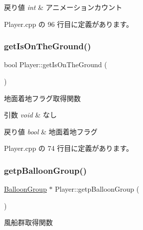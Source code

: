 \begin{DoxyRetVals}{戻り値}
{\em int} & アニメーションカウント \\
\hline
\end{DoxyRetVals}


 Player.\+cpp の 96 行目に定義があります。

\mbox{\label{class_player_aeb7e5d371b48735a6a9088fbe147d531}} 
\subsubsection{\texorpdfstring{get\+Is\+On\+The\+Ground()}{getIsOnTheGround()}}
{\footnotesize\ttfamily bool Player\+::get\+Is\+On\+The\+Ground (\begin{DoxyParamCaption}{ }\end{DoxyParamCaption})}



地面着地フラグ取得関数 


\begin{DoxyParams}{引数}
{\em void} & なし \\
\hline
\end{DoxyParams}

\begin{DoxyRetVals}{戻り値}
{\em bool} & 地面着地フラグ \\
\hline
\end{DoxyRetVals}


 Player.\+cpp の 74 行目に定義があります。

\mbox{\label{class_player_a60a79ad6d48a709e94c97178bb6f669a}} 
\subsubsection{\texorpdfstring{getp\+Balloon\+Group()}{getpBalloonGroup()}}
{\footnotesize\ttfamily \mbox{\hyperlink{class_balloon_group}{Balloon\+Group}} $\ast$ Player\+::getp\+Balloon\+Group (\begin{DoxyParamCaption}{ }\end{DoxyParamCaption})}



風船群取得関数 


